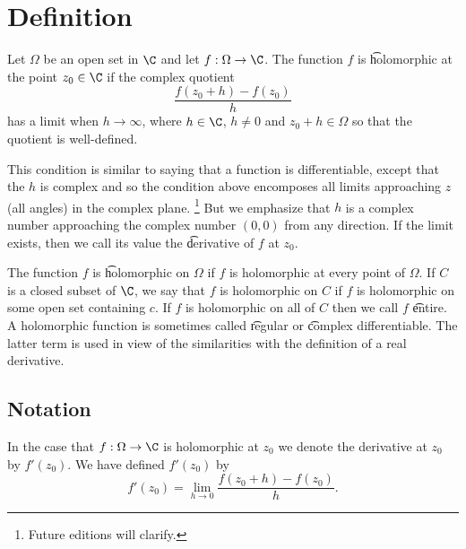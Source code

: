
\section*{Definition}

Let $\Omega $ be an open set in $\C $ and let $f: \Omega  \to \C $.
The function $f$ is \t{holomorphic at the point} $z_0 \in \C $ if the complex quotient
  \[
\frac{f(z_0 + h) - f(z_0)}{h}
  \]
has a limit when $h \to \infty$, where $h \in \C $, $h \not= 0$ and $z_0 + h \in \Omega $ so that the quotient is well-defined.

This condition is similar to saying that a function is differentiable, except that the $h$ is complex and so the condition above encomposes all limits approaching $z$ (all angles) in the complex plane.
  \ifhmode\unskip\fi\footnote{
Future editions will clarify.
  }
But we emphasize that $h$ is a complex number approaching the complex number $(0, 0)$ from any direction.
If the limit exists, then we call its value the \t{derivative of $f$ at $z_0$}.

The function $f$ is \t{holomorphic} on $\Omega $ if $f$ is holomorphic at every point of $\Omega $.
If $C$ is a closed subset of $\C $, we say that $f$ is holomorphic on $C$ if $f$ is holomorphic on some open set containing $c$.
If $f$ is holomorphic on all of $C$ then we call $f$ \t{entire}.
A holomorphic function is sometimes called \t{regular} or \t{complex differentiable}.
The latter term is used in view of the similarities with the definition of a real derivative.

\subsection*{Notation}

In the case that $f: \Omega  \to \C $ is holomorphic at $z_0$ we denote the derivative at $z_0$ by $f'(z_0)$.
We have defined $f'(z_0)$ by
  \[
f'(z_0) = \lim_{h \to 0} \frac{f(z_0 + h) - f(z_0)}{h}.
  \]

\blankpage